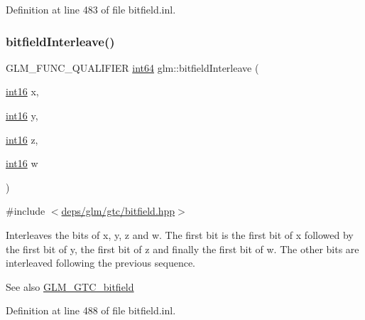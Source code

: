 Definition at line 483 of file bitfield.\+inl.

\mbox{\label{group__gtc__bitfield_ga09ee0be0fac790a1607a711e597dd9bf}} 
\subsubsection{\texorpdfstring{bitfield\+Interleave()}{bitfieldInterleave()}\hspace{0.1cm}{\footnotesize\ttfamily [15/16]}}
{\footnotesize\ttfamily G\+L\+M\+\_\+\+F\+U\+N\+C\+\_\+\+Q\+U\+A\+L\+I\+F\+I\+ER \hyperlink{group__gtc__type__precision_ga435d75819cce297cc5fa21bd84ef89a5}{int64} glm\+::bitfield\+Interleave (\begin{DoxyParamCaption}\item[{\hyperlink{group__gtc__type__precision_ga2945a61d12771f8954994fcddf02b021}{int16}}]{x,  }\item[{\hyperlink{group__gtc__type__precision_ga2945a61d12771f8954994fcddf02b021}{int16}}]{y,  }\item[{\hyperlink{group__gtc__type__precision_ga2945a61d12771f8954994fcddf02b021}{int16}}]{z,  }\item[{\hyperlink{group__gtc__type__precision_ga2945a61d12771f8954994fcddf02b021}{int16}}]{w }\end{DoxyParamCaption})}



{\ttfamily \#include $<$\hyperlink{bitfield_8hpp}{deps/glm/gtc/bitfield.\+hpp}$>$}

Interleaves the bits of x, y, z and w. The first bit is the first bit of x followed by the first bit of y, the first bit of z and finally the first bit of w. The other bits are interleaved following the previous sequence.

\begin{DoxySeeAlso}{See also}
\hyperlink{group__gtc__bitfield}{G\+L\+M\+\_\+\+G\+T\+C\+\_\+bitfield} 
\end{DoxySeeAlso}


Definition at line 488 of file bitfield.\+inl.

\mbox{\label{group__gtc__bitfield_gac8a926a7bfd9b23c22a4f685193fbfe1}} 
